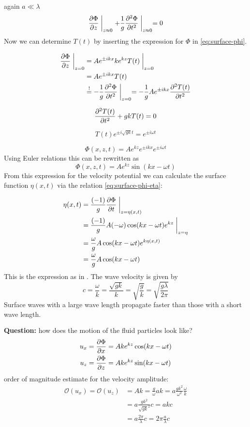 again $a\ll \lambda$
\begin{equation}
\frac{\partial \Phi}{\partial z}\biggm\vert_{z\approx0} + \frac{1}{g}\frac{\partial^2 \Phi}{\partial t^2}\biggm\vert_{z\approx0}=0
\end{equation}
Now we can determine $T(t)$ by inserting the expression for $\Phi$ in \eqref{eq:surface-phi}.

\begin{align}
\frac{\partial \Phi}{\partial z}\biggm\vert_{z=0} &= Ae^{\pm ikx}ke^{kz}T(t)\biggm\vert_{z=0}\\
&= Ae^{\pm ikx} T(t)\\
&\overset{!}{=} -\frac{1}{g} \frac{\partial^2 \Phi}{\partial t^2}\biggm\vert_{z=0} = -\frac{1}{g}Ae^{\pm ikx}\frac{\partial^2 T(t)}{\partial t^2}
\end{align}

\begin{equation}
\frac{\partial^2 T(t)}{\partial t^2}+gkT(t)=0
\end{equation}

\begin{equation}
T(t)e^{\pm i\sqrt{gk}t} = e^{\pm i\omega t}
\end{equation}

\begin{equation}
\Phi(x,z,t)=Ae^{kz}e^{\pm ikx}e^{\pm i\omega t}
\end{equation}
Using Euler relations this can be rewritten as
\begin{equation}
\Phi(x,z,t)=Ae^{kz}\sin(kx-\omega t)
\end{equation}
From this expression for the velocity potential we can calculate the surface function $\eta(x,t)$ via the relation \eqref{eq:surface-phi-eta}:

\begin{align}
\eta(x,t) &= \frac{(-1)}{g}\frac{\partial \Phi}{\partial t}\biggm\vert_{z=\eta(x,t)}\\
&= \frac{(-1)}{g}A(-\omega)\cos(kx-\omega t)e^{kz}\biggm\vert_{z=\eta}\\
&= \frac{\omega}{g}A\cos(kx-\omega t)e^{k\eta(x,t)}\\
&=\frac{\omega}{g}A\cos(kx-\omega t)
\end{align}
This is the expression as in . The wave velocity is given by
\begin{equation}
c = \frac{\omega}{k} = \frac{\sqrt{gk}}{k} = \sqrt{\frac{g}{k}} = \sqrt{\frac{g\lambda}{2\pi}}
\end{equation}
Surface waves with a large wave length propagate faster than those with a short wave length.

\textbf{Question:} how does the motion of the fluid particles look like?
\begin{align}
u_x &= \frac{\partial \Phi}{\partial x}=Ake^{kz}\cos(kx-\omega t)\\
u_z &= \frac{\partial \Phi}{\partial z}=Ake^{kz}\sin(kx-\omega t)
\end{align}
order of magnitude estimate for the velocity amplitude:
\begin{align}
\mathcal{O}(u_x) = \mathcal{O}(u_z) &= Ak = \frac{g}{\omega}ak=a\frac{gk^2}{\omega^2} \frac{\omega}{k}\\
&= a \frac{gk^2}{\sqrt{gk}^2}c = akc\\
&= a\frac{2\pi}{\lambda}c = 2\pi\frac{a}{\lambda}c
\end{align}


